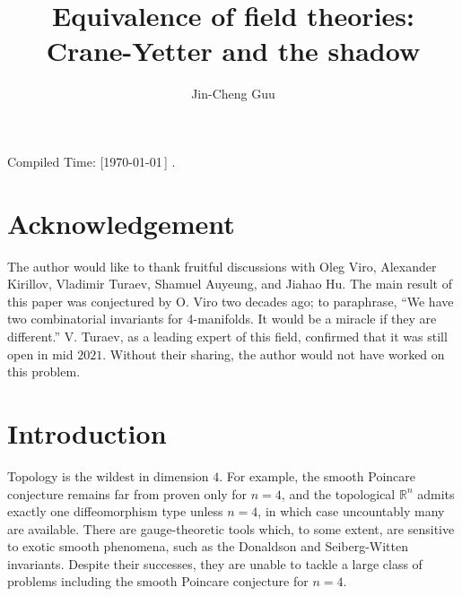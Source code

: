 \documentclass[12pt]{extarticle}
\title{Equivalence of field theories: Crane-Yetter and the shadow}
\author{Jin-Cheng Guu}
\date{}
\numberwithin{equation}{section} %
\theoremstyle{mystyle}
\begin{document}
\maketitle
\begin{flushright}
  \tiny{Compiled Time: [\today\,\DTMcurrenttime]} \quad\qquad.
\end{flushright}

\tableofcontents
\section*{Acknowledgement}

The author would like to thank fruitful discussions with Oleg
Viro, Alexander Kirillov, Vladimir Turaev, Shamuel Auyeung, and
Jiahao Hu. The main result of this paper was conjectured by O.
Viro two decades ago; to paraphrase, ``We have two combinatorial
invariants for 4-manifolds. It would be a miracle if they are
different.'' V. Turaev, as a leading expert of this field,
confirmed that it was still open in mid $2021$. Without their
sharing, the author would not have worked on this problem.

\section{Introduction}

Topology is the wildest in dimension $4$. For example, the smooth
Poincare conjecture remains far from proven only for $n = 4$, and
the topological $\mathbb{R}^{n}$ admits exactly one
diffeomorphism type unless $n=4$, in which case uncountably many
are available. There are gauge-theoretic tools which, to some
extent, are sensitive to exotic smooth phenomena, such as the
Donaldson and Seiberg-Witten invariants. Despite their successes,
they are unable to tackle a large class of problems including the
smooth Poincare conjecture for $n=4$.
\end{document}
